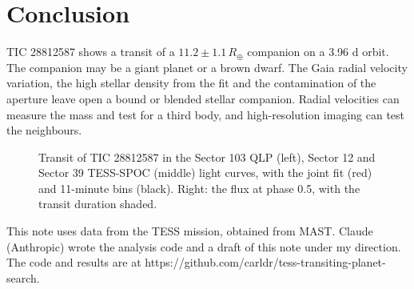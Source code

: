 \documentclass{aastex701}
\begin{document}
\section{Conclusion}

TIC 28812587 shows a transit of a $11.2 \pm 1.1\,R_\oplus$ companion on a 3.96 d orbit. The companion may be a giant
planet or a brown dwarf. The Gaia radial velocity variation, the high stellar density from the fit and the
contamination of the aperture leave open a bound or blended stellar companion. Radial velocities can measure the mass
and test for a third body, and high-resolution imaging can test the neighbours.

\begin{figure}[ht!]
\caption{Transit of TIC 28812587 in the Sector 103 QLP (left), Sector 12 and Sector 39 TESS-SPOC (middle) light
curves, with the joint fit (red) and 11-minute bins (black). Right: the flux at phase 0.5, with the transit duration
shaded.
\label{fig:transit}}
\end{figure}

\begin{acknowledgments}
This note uses data from the TESS mission, obtained from MAST. Claude (Anthropic) wrote the analysis code and a draft of
this note under my direction. The code and results are at https://github.com/carldr/tess-transiting-planet-search.
\end{acknowledgments}



{}

\end{document}
